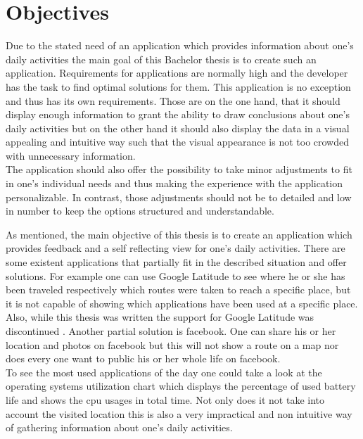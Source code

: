 \section{Objectives}
\label{sec:objectives}

Due  to the stated need of an application which provides information about one's daily activities the main goal of this Bachelor thesis is to create such an application.
Requirements for applications are normally high and the developer has the task to find optimal solutions for them. This application is no exception and thus has its own requirements. Those are on the one hand, that it should display enough information to grant the ability to draw conclusions about one's daily activities but on the other hand it should also display the data in a visual appealing and intuitive way such that the visual appearance is not too crowded with unnecessary information.\\
The application should also offer the possibility to take minor adjustments to fit in one's individual needs and thus making the experience with the application personalizable. In contrast, those adjustments should not be to detailed and low in number to keep the options structured and understandable.

As  mentioned, the main objective of this thesis is to create an application which provides feedback and a self reflecting view for one's daily activities. There are some existent applications that partially fit in the described  situation and offer solutions. For example one can use Google Latitude to see where he or she has been traveled respectively which routes were taken to reach a specific place, but it is not capable of showing which applications have been used at a specific place. Also, while this thesis was written the support for Google Latitude was discontinued \cite{googlelatitudedead}. Another partial solution is facebook. One can share his or her location and photos on facebook but this will not show a route on a map nor does every one want to public his or her whole life on facebook.\\
To see the most used applications of the day one could take a look at the operating systems utilization chart which displays the percentage of used battery life and shows the cpu usages in total time. Not only does it not take into account the visited location this is also a very impractical and non intuitive way of gathering information about one's daily activities.

